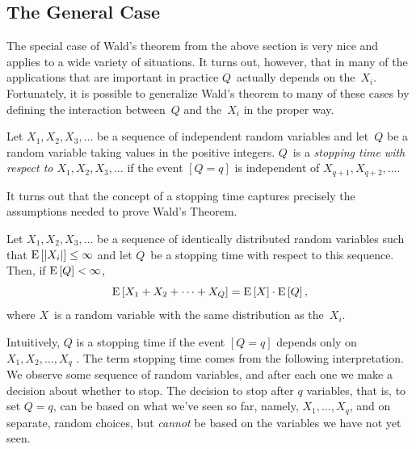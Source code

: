 \documentclass[11pt,twoside]{article}
\begin{document}
\subsection{The General Case}

The special case of Wald's theorem from the above section is very nice
and applies to a wide variety of situations.  It turns out, however,
that in many of the applications that are important in practice
$Q$~actually depends on the~$X_i$.  Fortunately, it is possible to
generalize Wald's theorem to many of these cases by defining the
interaction between~$Q$ and the~$X_i$ in the proper way.
\begin{definition}
  Let $X_1, X_2, X_3, \ldots$ be a sequence of independent random
  variables and let~$Q$ be a random variable taking values in the
  positive integers.  $Q$~is a \emph{stopping time with respect to
    $X_1, X_2, X_3, \dots$} if the event $[Q = q]$ is independent
  of $X_{q+1}, X_{q+2}, \dots$.
\end{definition}
It turns out that the concept of a stopping time captures precisely
the assumptions needed to prove Wald's Theorem.
\begin{theorem}
  Let $X_1, X_2, X_3, \ldots$ be a sequence of identically distributed
  random variables such that $\mathop{\textup{E}}\nolimits\left[\left|X_i\right|\right] \leq \infty$ and let $Q$~be a
  stopping time with respect to this sequence. Then, if $\mathop{\textup{E}}\nolimits\left[Q\right] <
  \infty$,
  \begin{displaymath}
    \mathop{\textup{E}}\nolimits\left[X_1 + X_2 + \cdots + X_Q\right] = \mathop{\textup{E}}\nolimits\left[X\right] \cdot \mathop{\textup{E}}\nolimits\left[Q\right],
  \end{displaymath}
  where $X$~is a random variable with the same distribution as
  the~$X_i$.
\end{theorem}
Intuitively, $Q$ is a stopping time if the event $[Q = q]$ depends
only on $X_1, X_2, \ldots, X_q$ .  The term stopping time comes from
the following interpretation.  We observe some sequence of random
variables, and after each one we make a decision about whether to
stop.  The decision to stop after $q$ variables, that is,  to set $Q=q$,
can be based on what we've seen so far, namely, $X_1,\dots,X_q$, and on
separate, random choices, but \emph{cannot} be based on the variables
we have not yet seen.
\end{document}
